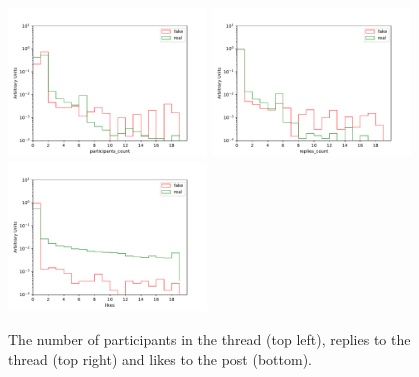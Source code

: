 \documentclass[a4paper,12pt]{article} %
\begin{document}
\begin{figure}[h!]
\caption{The number of participants in the thread (top left), replies to the thread (top right)
and likes to the post (bottom). \label{fig:post_feedback}}
\begin{center}
\includegraphics[width=0.47\textwidth]{plots/participants_count} \hspace{0.2cm}
\includegraphics[width=0.47\textwidth]{plots/replies_count} \\
\includegraphics[width=0.47\textwidth]{plots/likes}
\end{center}
\end{figure}
\end{document}
